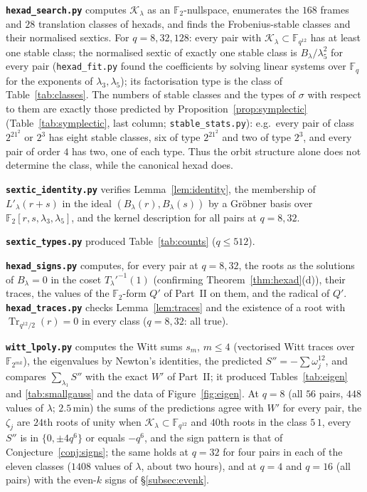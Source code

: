 \documentclass[12pt,a4paper]{amsart}
\theoremstyle{definition}
\newcommand{\F}{\mathbb{F}}
\newcommand{\Tr}{\operatorname{Tr}}
\newcommand{\Kk}{\mathcal{K}}
\newcommand{\Spp}{S''}
\begin{document}
\textbf{\texttt{hexad\_search.py}} computes $\Kk_\lambda$ as an $\F_2$-nullspace, enumerates the $168$ frames and $28$ translation classes of hexads, and finds the Frobenius-stable classes and their normalised sextics. For $q=8,32,128$: every pair with $\Kk_\lambda\subset\F_{q^{12}}$ has at least one stable class; the normalised sextic of exactly one stable class is $B_\lambda/\lambda_5^2$ for every pair (\texttt{hexad\_fit.py} found the coefficients by solving linear systems over $\F_q$ for the exponents of $\lambda_3,\lambda_5$); its factorisation type is the class of Table~\ref{tab:classes}. The numbers of stable classes and the types of $\sigma$ with respect to them are exactly those predicted by Proposition~\ref{prop:symplectic} (Table~\ref{tab:symplectic}, last column; \texttt{stable\_stats.py}): e.g.\ every pair of class $2^21^2$ or $2^3$ has eight stable classes, six of type $2^21^2$ and two of type $2^3$, and every pair of order $4$ has two, one of each type. Thus the orbit structure alone does not determine the class, while the canonical hexad does.

\textbf{\texttt{sextic\_identity.py}} verifies Lemma~\ref{lem:identity}, the membership of $L'_\lambda(r+s)$ in the ideal $(B_\lambda(r),B_\lambda(s))$ by a Gr\"obner basis over $\F_2[r,s,\lambda_3,\lambda_5]$, and the kernel description for all pairs at $q=8,32$.

\textbf{\texttt{sextic\_types.py}} produced Table~\ref{tab:counts} ($q\le512$).

\textbf{\texttt{hexad\_signs.py}} computes, for every pair at $q=8,32$, the roots as the solutions of $B_\lambda=0$ in the coset $T_\lambda'^{-1}(1)$ (confirming Theorem~\ref{thm:hexad}(d)), their traces, the values of the $\F_2$-form $Q'$ of Part~II on them, and the radical of $Q'$. \textbf{\texttt{hexad\_traces.py}} checks Lemma~\ref{lem:traces} and the existence of a root with $\Tr_{q^{12}/2}(r)=0$ in every class ($q=8,32$: all true).

\textbf{\texttt{witt\_lpoly.py}} computes the Witt sums $s_m$, $m\le4$ (vectorised Witt traces over $\F_{2^{mk}}$), the eigenvalues by Newton's identities, the predicted $\Spp=-\sum\omega_j^{12}$, and compares $\sum_{\lambda_1}\Spp$ with the exact $W'$ of Part~II; it produced Tables~\ref{tab:eigen} and \ref{tab:smallgauss} and the data of Figure~\ref{fig:eigen}. At $q=8$ (all $56$ pairs, $448$ values of $\lambda$; $2.5$\,min) the sums of the predictions agree with $W'$ for every pair, the $\zeta_j$ are $24$th roots of unity when $\Kk_\lambda\subset\F_{q^{12}}$ and $40$th roots in the class $5\,1$, every $\Spp$ is in $\{0,\pm4q^6\}$ or equals $-q^6$, and the sign pattern is that of Conjecture~\ref{conj:signs}; the same holds at $q=32$ for four pairs in each of the eleven classes ($1408$ values of $\lambda$, about two hours), and at $q=4$ and $q=16$ (all pairs) with the even-$k$ signs of \S\ref{subsec:evenk}.
\end{document}
